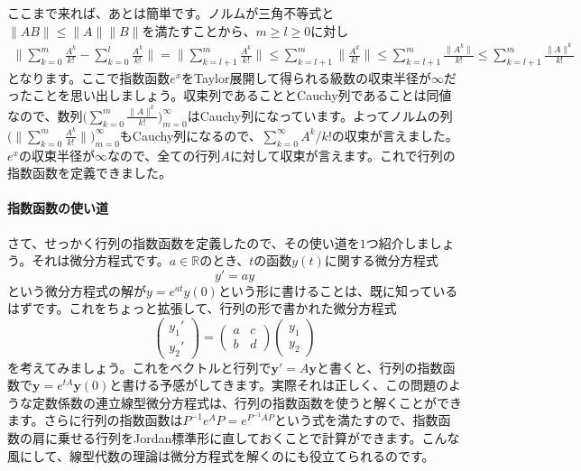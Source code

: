 ここまで来れば、あとは簡単です。ノルムが三角不等式と$\|AB\| \leq \|A\| \|B\|$を満たすことから、$m \geq l \geq 0$に対し
\begin{align*}
\Biggl\|\sum_{k = 0}^m \frac{A^k}{k!} - \sum_{k = 0}^l \frac{A^k}{k!} \Biggr\|
= \Biggl\|\sum_{k = l + 1}^m \frac{A^k}{k!} \Biggr\|
\leq \sum_{k = l + 1}^m \biggl\|\frac{A^k}{k!} \biggr\|
\leq \sum_{k = l + 1}^m \frac{\|A^k\|}{k!}
\leq \sum_{k = l + 1}^m \frac{\|A\|^k}{k!}
\end{align*}
となります。ここで指数函数$e^x$をTaylor展開して得られる級数の収束半径が$\infty$だったことを思い出しましょう。収束列であることとCauchy列であることは同値なので、数列$\bigl(\sum_{k = 0}^m \frac{\|A\|^k}{k!}\bigr)_{m = 0}^{\infty}$はCauchy列になっています。よってノルムの列$\bigl(\|\sum_{k = 0}^m \frac{A^k}{k!}\|\bigr)_{m = 0}^{\infty}$もCauchy列になるので、$\sum_{k = 0}^{\infty} A^k / k!$の収束が言えました。$e^x$の収束半径が$\infty$なので、全ての行列$A$に対して収束が言えます。これで行列の指数函数を定義できました。

\paragraph{指数函数の使い道}

さて、せっかく行列の指数函数を定義したので、その使い道を$1$つ紹介しましょう。それは微分方程式です。$a \in \mathbb{R}$のとき、$t$の函数$y(t)$に関する微分方程式
\[
y' = ay
\]
という微分方程式の解が$y = e^{at} y(0)$という形に書けることは、既に知っているはずです。これをちょっと拡張して、行列の形で書かれた微分方程式
\[
\begin{pmatrix}
y_1' \\
y_2'
\end{pmatrix}
=
\begin{pmatrix}
a & c \\
b & d
\end{pmatrix}
\begin{pmatrix}
y_1 \\
y_2
\end{pmatrix}
\]
を考えてみましょう。これをベクトルと行列で$\bm{y}' = A \bm{y}$と書くと、行列の指数函数で$\bm{y} = e^{tA} \bm{y}(0)$と書ける予感がしてきます。実際それは正しく、この問題のような定数係数の連立線型微分方程式は、行列の指数函数を使うと解くことができます。さらに行列の指数函数は$P^{-1} e^{A} P = e^{P^{-1} A P}$という式を満たすので、指数函数の肩に乗せる行列をJordan標準形に直しておくことで計算ができます。こんな風にして、線型代数の理論は微分方程式を解くのにも役立てられるのです。

